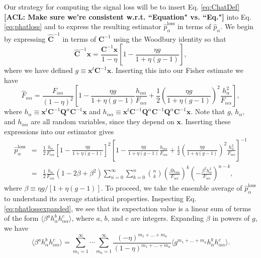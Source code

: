 \documentclass[preprint2,numberedappendix,tighten]{aastex6}  %
\newcommand{\x}{\mathbf{x}}
\newcommand{\C}{\mathbf{C}}
\newcommand{\Chat}{\mathbf{\hat{C}}}
\newcommand{\Q}{\mathbf{Q}}
\newcommand{\acl}[1]{{\color{red} \textbf{[ACL:  #1]}}}
\begin{document}
Our strategy for computing the signal loss will be to insert Eq. \eqref{eq:ChatDef} \acl{Make sure we're consistent w.r.t. ``Equation" vs. ``Eq."} into Eq. \eqref{eq:phatloss} and to express the resulting estimator $\hat{p}_\alpha^\textrm{loss}$ in terms of $\hat{p}_\alpha$. We begin by expressing $\Chat^{-1}$ in terms of $\C^{-1}$ using the Woodbury identity so that
\begin{equation}
\Chat^{-1}\x = \frac{\C^{-1}\x}{1-\eta} \left[ 1 - \frac{\eta g}{1+ \eta (g-1)}\right],
\end{equation}
where we have defined $g \equiv \x^t \C^{-1} \x$. Inserting this into our Fisher estimate we have
\begin{equation}
\hat{F}_{\alpha \alpha} = \frac{F_{\alpha \alpha}}{(1-\eta)^2} \left[ 1 -\frac{\eta g}{1+ \eta (g-1)} \frac{h_{\alpha \alpha}}{F_{\alpha \alpha}} + \frac{1}{2} \left( \frac{\eta g}{1+ \eta (g-1)} \right)^2 \frac{h_\alpha^2}{F_{\alpha \alpha}}\right],
\end{equation}
where $h_\alpha \equiv \x^t \C^{-1} \Q^\alpha \C^{-1} \x $ and $h_{\alpha \alpha} \equiv \x^t \C^{-1} \Q^\alpha \C^{-1} \Q^\alpha \C^{-1}\x $. Note that $g$, $h_\alpha$, and $h_{\alpha \alpha}$ are all random variables, since they depend on $\x$. Inserting these expressions into our estimator gives
\begin{eqnarray}
\label{eq:phatlossexpanded}
\hat{p}_\alpha^\textrm{loss} &=& \frac{1}{2} \frac{h_\alpha}{F_{\alpha \alpha}} \left[ 1 - \frac{\eta g}{1+ \eta (g-1)}\right]^2  \left[ 1 -\frac{\eta g}{1+ \eta (g-1)} \frac{h_{\alpha \alpha}}{F_{\alpha \alpha}} + \frac{1}{2} \left( \frac{\eta g}{1+ \eta (g-1)} \right)^2 \frac{h_\alpha^2}{F_{\alpha \alpha}}\right]^{-1} \nonumber \\
&=& \frac{1}{2} \frac{h_\alpha}{F_{\alpha \alpha}}\left(1-2\beta + \beta^2\right)\sum_{n=0}^\infty \sum_{k=0}^n {n \choose k} \left( \frac{\beta h_{\alpha \alpha}}{F_{\alpha \alpha}}\right)^k \left( - \frac{\beta^2 h_\alpha^2}{F_{\alpha \alpha}}\right)^{n-k},
\end{eqnarray}
where $\beta \equiv \eta g/[1+ \eta (g-1)]$. To proceed, we take the ensemble average of $\hat{p}_\alpha^\textrm{loss}$ to understand its average statistical properties. Inspecting Eq. \eqref{eq:phatlossexpanded}, we see that its expectation value is a linear sum of terms of the form $\langle \beta^a h_\alpha^b h_{\alpha \alpha}^c \rangle$, where $a$, $b$, and $c$ are integers. Expanding $\beta$ in powers of $g$, we have
\begin{equation}
\label{eq:betahh}
\langle \beta^a h_\alpha^b h_{\alpha \alpha}^c \rangle = \sum_{m_1 = 1}^\infty \cdots \sum_{m_a = 1}^\infty \frac{(-\eta)^{m_1 + \dots + m_a}}{(1-\eta)^{m_1 + \dots + m_a}} \langle g^{m_1 + \dots + m_a} h_\alpha^b h_{\alpha \alpha}^c \rangle.
\end{equation}
\end{document}
